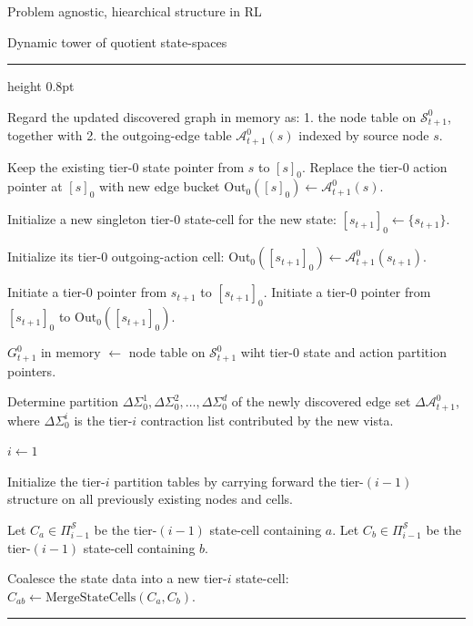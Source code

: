 \documentclass[11pt]{article}
\newenvironment{breakablealgorithm}
    {%
    \begin{center}
    \refstepcounter{algorithm}
    \hrule height 0.8pt\kern 2pt 
    \renewcommand{\caption}[2][\relax]{%
        {\raggedright\textbf{Algorithm \thealgorithm: ##2}\par}
        \ifx\relax##1\relax
            \addcontentsline{loa}{algorithm}{\protect\numberline{\thealgorithm}##2}%
        \else
            \addcontentsline{loa}{algorithm}{\protect\numberline{\thealgorithm}##1}%
            \fi 
        \kern 2pt\hrule\kern 2pt }
    }{%
    \kern 2pt\hrule \end{center} 
    }
\begin{document}
\begin{section}{Problem agnostic, hiearchical structure in RL}
\begin{subsection}{Dynamic tower of quotient state-spaces}
\begin{breakablealgorithm}
\begin{algorithmic}[1]
    \State Regard the updated discovered graph in memory as:
    1. the node table on $\mathcal{S}_{t+1}^0$, together with
    2. the outgoing-edge table $\mathcal{A}_{t+1}^0(s)$ indexed by source node $s$.


        \State Keep the existing tier-$0$ state pointer from $s$ to $[s]_0$.
        \State Replace the tier-$0$ action pointer at $[s]_0$ with new edge bucket
        $
        \mathrm{Out}_0([s]_0)\gets \mathcal{A}_{t+1}^0(s).
        $
    \EndFor

    \State Initialize a new singleton tier-$0$ state-cell for the new state:
    $
    [s_{t+1}]_0\gets \{s_{t+1}\}.
    $

    \State Initialize its tier-$0$ outgoing-action cell:
    $
    \mathrm{Out}_0([s_{t+1}]_0)\gets \mathcal{A}_{t+1}^0(s_{t+1}).
    $

    \State Initiate a tier-$0$ pointer from $s_{t+1}$ to $[s_{t+1}]_0$.
    \State Initiate a tier-$0$ pointer from $[s_{t+1}]_0$ to $\mathrm{Out}_0([s_{t+1}]_0)$.

    \State $G_{t+1}^0$ in memory $\gets$ node table on $\mathcal{S}_{t+1}^0$ wiht tier-$0$ state and action partition pointers.

    \State Determine partition
    $
    \Delta\Sigma_0^1,\Delta\Sigma_0^2,\dots,\Delta\Sigma_0^d
    $
    of the newly discovered edge set $\Delta\mathcal{A}_{t+1}^0$, where $\Delta\Sigma_0^i$ is the tier-$i$ contraction list contributed by the new vista.


    \State $i \gets 1$

        \State Initialize the tier-$i$ partition tables by carrying forward the tier-$(i-1)$ structure on all previously existing nodes and cells.

            \State Let $C_a\in\Pi_{i-1}^{\mathcal S}$ be the tier-$(i-1)$ state-cell containing $a$.
            \State Let $C_b\in\Pi_{i-1}^{\mathcal S}$ be the tier-$(i-1)$ state-cell containing $b$.

                \State Coalesce the state data into a new tier-$i$ state-cell:
                $
                C_{ab}\gets \mathrm{MergeStateCells}(C_a,C_b).
                $


\end{algorithmic}
\end{breakablealgorithm}
\end{subsection}
\end{section}
\end{document}
